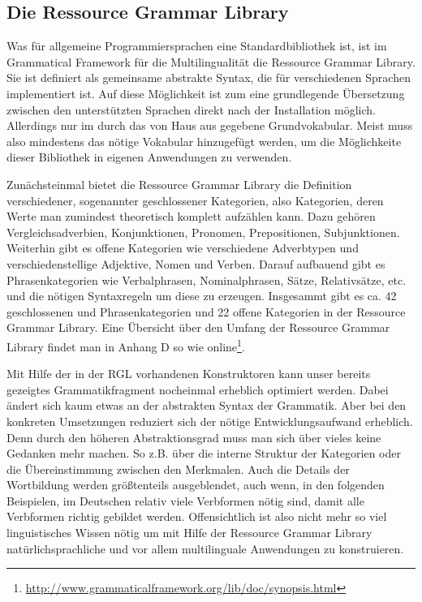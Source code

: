 \documentclass[12pt,abstract=on,titlepage,bibliography=totoc,ngerman,listof=totoc]{scrreprt}
\begin{document}
\subsection{Die Ressource Grammar Library}
\label{subsec:rgl}
Was für allgemeine Programmiersprachen eine Standardbibliothek ist, ist im Grammatical Framework für die Multilingualität die Ressource Grammar Library. Sie ist definiert als gemeinsame abstrakte Syntax, die für verschiedenen Sprachen implementiert ist. Auf diese Möglichkeit ist zum eine grundlegende Übersetzung zwischen den unterstützten Sprachen direkt nach der Installation möglich. Allerdings nur im durch das von Haus aus gegebene Grundvokabular. Meist muss also mindestens das nötige Vokabular hinzugefügt werden, um die Möglichkeite dieser Bibliothek in eigenen Anwendungen zu verwenden. \par
Zunächsteinmal bietet die Ressource Grammar Library die Definition verschiedener, sogenannter geschlossener Kategorien, also Kategorien, deren Werte man zumindest theoretisch komplett aufzählen kann. Dazu gehören Vergleichsadverbien, Konjunktionen, Pronomen, Prepositionen, Subjunktionen. Weiterhin gibt es offene Kategorien wie verschiedene Adverbtypen und verschiedenstellige Adjektive, Nomen und Verben. Darauf aufbauend gibt es Phrasenkategorien wie Verbalphrasen, Nominalphrasen, Sätze, Relativsätze, etc. und die nötigen Syntaxregeln um diese zu erzeugen. Insgesammt gibt es ca. 42 geschlossenen und Phrasenkategorien und 22 offene Kategorien in der Ressource Grammar Library. Eine Übersicht über den Umfang der Ressource Grammar Library findet man in \cite{RANTA2011} Anhang D so wie online\footnote{\url{http://www.grammaticalframework.org/lib/doc/synopsis.html}}. \par
Mit Hilfe der in der RGL vorhandenen Konstruktoren kann unser bereits gezeigtes Grammatikfragment nocheinmal erheblich optimiert werden. Dabei ändert sich kaum etwas an der abstrakten Syntax der Grammatik. Aber bei den konkreten Umsetzungen reduziert sich der nötige Entwicklungsaufwand erheblich. Denn durch den höheren Abstraktionsgrad muss man sich über vieles keine Gedanken mehr machen. So z.B. über die interne Struktur der Kategorien oder die Übereinstimmung zwischen den Merkmalen. Auch die Details der Wortbildung werden größtenteils ausgeblendet, auch wenn, in den folgenden Beispielen, im Deutschen relativ viele Verbformen nötig sind, damit alle Verbformen richtig gebildet werden. Offensichtlich ist also nicht mehr so viel linguistisches Wissen nötig um mit Hilfe der Ressource Grammar Library natürlichsprachliche und vor allem multilinguale Anwendungen zu konstruieren. \par
\end{document}
